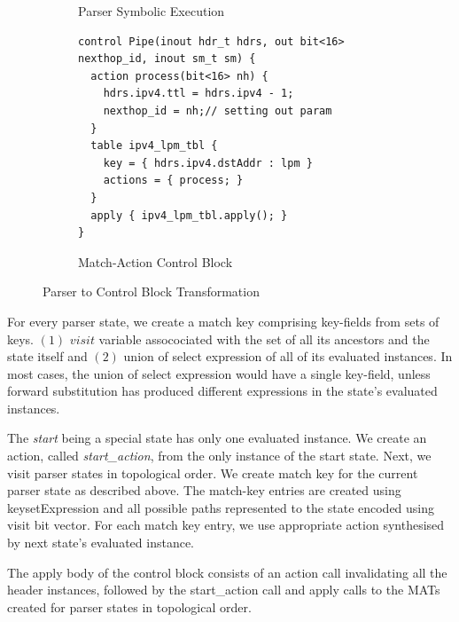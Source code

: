 \documentclass{hotnets19}
\begin{document}
\begin{figure}[!h]
\begin{subfigure}[b]{0.3\linewidth}
        \caption{Parser Symbolic Execution}
        \label{subfig:parser-symbolic-execution}
    \end{subfigure}
    \begin{subfigure}[b]{.4\linewidth}
\begin{lstlisting}[frame=none]
control Pipe(inout hdr_t hdrs, out bit<16> nexthop_id, inout sm_t sm) {
  action process(bit<16> nh) {
    hdrs.ipv4.ttl = hdrs.ipv4 - 1;
    nexthop_id = nh;// setting out param
  }
  table ipv4_lpm_tbl {
    key = { hdrs.ipv4.dstAddr : lpm } 
    actions = { process; }
  }
  apply { ipv4_lpm_tbl.apply(); }
}
\end{lstlisting}
\caption{Match-Action Control Block}
\label{subfig:parser-symbolic-execution}
\end{subfigure}
\caption{Parser to Control Block Transformation}
\label{fig:parser-to-control-block-transformation}
\end{figure}

For every parser state, we create a match key comprising key-fields from sets of keys. 
$(1)$ $visit$ variable assocociated with the set of all its ancestors and the state itself and
$(2)$ union of select expression of all of its evaluated instances.
In most cases, the union of select expression would have a single key-field, unless forward substitution has produced different expressions in the state's evaluated instances.

The \emph{start} being a special state has only one evaluated instance.
We create an action, called \emph{start\_action}, from the only instance of the start state.
Next, we visit parser states in topological order. 
We create match key for the current parser state as described above.
The match-key entries are created using keysetExpression and all possible paths represented to the state encoded using visit bit vector.
For each match key entry, we use appropriate action synthesised by next state's evaluated instance.

The apply body of the control block consists of an action call invalidating all the header instances, followed by the start\_action call and apply calls to the MATs created for parser states in topological order.
\end{document}
